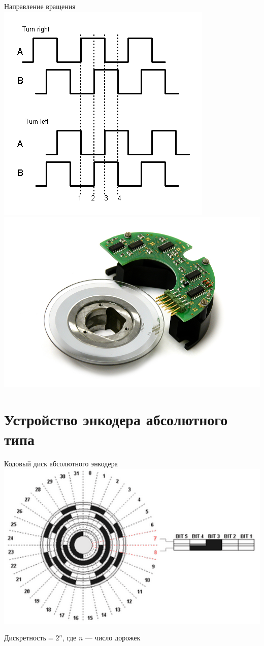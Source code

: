 \begin{frame}{Направление вращения}
    \centering
    \includegraphics[width=.4\linewidth]{../Figures/reverse.png}
    \qquad
    \includegraphics[width=.4\linewidth]{../Figures/splitenc.png}
\end{frame}

\section{Устройство энкодера абсолютного типа}

\begin{frame}{Кодовый диск абсолютного энкодера}
    \centering
    \includegraphics[width=.8\linewidth]{../Figures/code.png}

    $\textrm{Дискретность} = 2^n$, где $n$ --- число дорожек
\end{frame}

